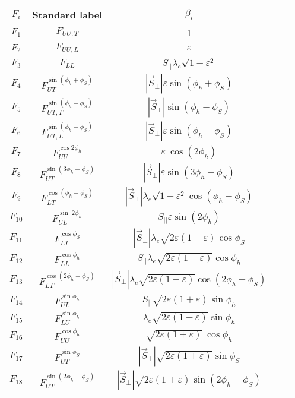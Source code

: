 \documentclass[floatfix,aps,prd,nofootinbib,superscriptaddress,preprint]{revtex4}
\newcommand\3[1]{\boldsymbol{#1}}
\begin{document}
\begin{table}[h!]
\begin{tabular}{|c|c|c|c|c|}
\hline
$F_i$    & Standard label                    & $\beta_i$\\\hline
$F_1$    & $F_{UU,T}$                        & 1\\\hline
$F_2$    & $F_{UU,L}$                        & $\varepsilon$\\\hline
$F_3$    & $F_{LL}$                          & $S_{||} \lambda_e \sqrt{1-\varepsilon^2}$\\\hline
$F_4$ & $F_{UT}^{\sin(\phi_h+\phi_S)}$    & $|\vec{S}_\perp|\varepsilon\sin(\phi_h+\phi_S)$\\\hline
$F_5$ & $F_{UT,T}^{\sin(\phi_h-\phi_S)}$  & $|\vec{S}_\perp|\sin(\phi_h-\phi_S)$\\\hline
$F_6$ & $F_{UT,L}^{\sin(\phi_h-\phi_S)}$  & $|\vec{S}_\perp|\varepsilon\sin(\phi_h-\phi_S)$\\\hline
$F_7$    & $F_{UU}^{\cos 2\phi_h}$           & $\varepsilon ~ \cos(2\phi_h)$\\\hline
$F_8$ & $F_{UT}^{\sin(3\phi_h - \phi_S)}$ & $|\vec{S}_\perp| \varepsilon \sin(3\phi_h - \phi_S)$\\\hline
$F_9$ & $F_{LT}^{\cos(\phi_h-\phi_S)}$    & $|\vec{S}_\perp|\lambda_e \sqrt{1-\varepsilon^2}\cos(\phi_h-\phi_S)$\\\hline
$F_{10}$    & $F_{UL}^{\sin ~ 2\phi_h}$         & $S_{||}\varepsilon \sin(2\phi_h)$\\\hline
$F_{11}$ & $F_{LT}^{ \cos\phi_S}$            & $|\vec{S}_\perp|\lambda_e \sqrt{2\varepsilon(1-\varepsilon)} \cos\phi_S$\\\hline
$F_{12}$    & $F_{LL}^{\cos\phi_h}$             & $S_{||} \lambda_e  \sqrt{2\varepsilon(1-\varepsilon)} \cos\phi_h$\\\hline
$F_{13}$ & $F_{LT}^{\cos(2\phi_h-\phi_S)}$   & $|\vec{S}_\perp|\lambda_e \sqrt{2\varepsilon(1-\varepsilon)} \cos(2\phi_h-\phi_S)$\\\hline
$F_{14}$    & $F_{UL}^{\sin\phi_h}$             & $S_{||}\sqrt{2\varepsilon (1+\varepsilon)}\sin\phi_h$\\\hline
$F_{15}$    & $F_{LU}^{\sin\phi_h}$             & $\lambda_e\sqrt{2\varepsilon (1-\varepsilon)} \sin\phi_h $\\\hline
$F_{16}$    & $F_{UU}^{\cos \phi_h}$            & $\sqrt{2\varepsilon (1+\varepsilon)} ~ \cos\phi_h$\\\hline
$F_{17}$ & $F_{UT}^{\sin\phi_S}$             & $|\vec{S}_\perp| \sqrt{2\varepsilon (1+\varepsilon)}\sin\phi_S$\\\hline
$F_{18}$ & $F_{UT}^{\sin(2\phi_h-\phi_S)}$   & $|\vec{S}_\perp| \sqrt{2\varepsilon (1+\varepsilon)}\sin(2\phi_h-\phi_S)$\\\hline
\end{tabular}
\end{table}
\end{document}
